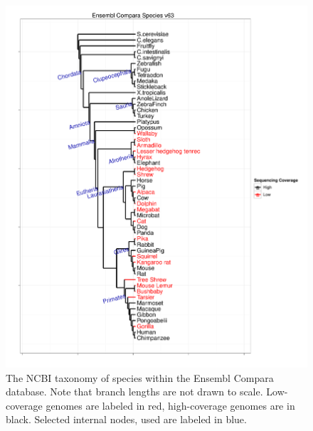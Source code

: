 \begin{figure}[ht]
\centering
\includegraphics[scale=0.4]{Figs/compara_63_tree.pdf}
\caption{The NCBI taxonomy of species within the Ensembl Compara
  database. Note that branch lengths are not drawn to
  scale. Low-coverage genomes are labeled in red, high-coverage
  genomes are in black. Selected internal nodes, used are labeled in
  blue.}
\label{ncbi_tree}
\end{figure}


